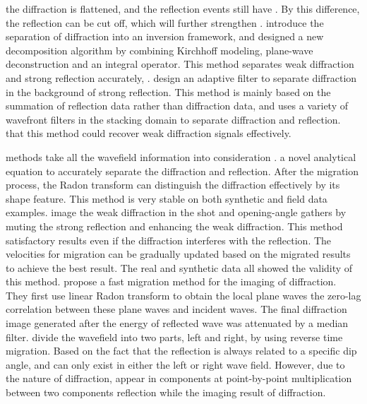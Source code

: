 the diffraction is flattened, and the reflection events still have . By this difference, the reflection can be cut off, which will further strengthen . \cite{merzlikin2019least} introduce the separation of diffraction into an inversion framework, and designed a new decomposition algorithm by combining Kirchhoff modeling, plane-wave deconstruction and an integral operator. This method  separates weak diffraction and strong reflection accurately, . \cite{Benjamin2019cohe} design an adaptive filter to separate diffraction in the background of strong reflection. This method is mainly based on the summation of reflection data rather than diffraction data, and uses a variety of wavefront filters in the stacking domain to separate diffraction and reflection.  that this method could recover weak diffraction signals effectively. 

 methods take all the wavefield information into consideration \cite[]{Sava2005wave,Hemin2019gpr}. \cite{Klokov2012dip}  a novel analytical equation to accurately separate the diffraction and reflection. After the migration process, the Radon transform can distinguish the diffraction effectively by its shape feature. This method is very stable on both synthetic and field data examples. \cite{Zhang2014opening} image the weak diffraction in the shot and opening-angle gathers by muting the strong reflection and enhancing the weak diffraction. This method  satisfactory results even if the diffraction interferes with the reflection. The velocities for migration can be gradually updated based on the migrated results to achieve the best result. The real and synthetic data all showed the validity of this method. \cite{Liu2016wave} propose a fast migration method for the imaging of diffraction. They first use linear Radon transform to obtain the local plane waves the zero-lag correlation between these plane waves and incident waves. The final diffraction image  generated after the energy of reflected wave was attenuated by a median filter. \cite{Dongliang2019wave} divide the wavefield into two parts, left and right, by using reverse time migration. Based on the fact that the reflection is always related to a specific dip angle, and can only exist in either the left or right wave field. However, due to the nature of diffraction,  appear in  components at  point-by-point multiplication between two components reflection while the imaging result of diffraction.


